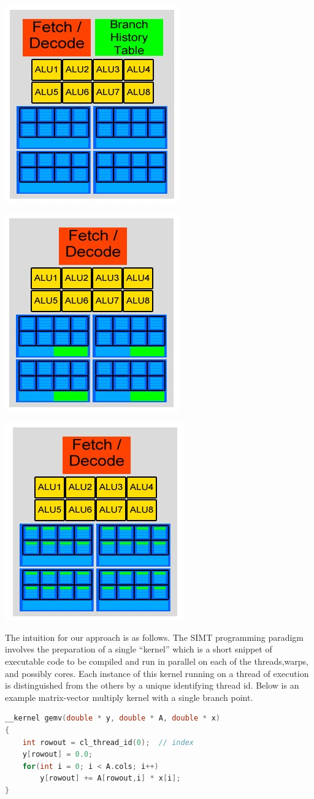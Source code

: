 \documentclass[conference]{IEEEtran}
\begin{document}
\begin{center}
	\includegraphics[width=.2\textwidth]{Our-GPU---per-core-predictor.jpg}
\end{center}

\begin{center}
	\includegraphics[width=.2\textwidth]{Our-GPU---per-context-group-predictor.jpg}
\end{center}

\begin{center}
	\includegraphics[width=.2\textwidth]{Our-GPU---per-element-predictor.jpg}
\end{center}

The intuition for our approach is as follows.  The SIMT programming paradigm involves the preparation of a single ``kernel'' which is a short
snippet of executable code to be compiled and run in parallel on each of the threads,warps, and possibly cores.  Each instance of this kernel
running on a thread of execution is distinguished from the others by a unique identifying thread id.  Below is an example matrix-vector multiply
kernel with a single branch point.

\begin{lstlisting}[language=C,basicstyle=\footnotesize,frame=single,tabsize=4,title=GemV.cl]
__kernel gemv(double * y, double * A, double * x)
{
    int rowout = cl_thread_id(0);  // index
    y[rowout] = 0.0;
    for(int i = 0; i < A.cols; i++)
        y[rowout] += A[rowout,i] * x[i];
}
\end{lstlisting}
\end{document}
